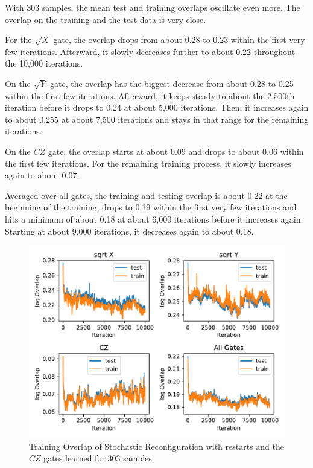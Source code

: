 With 303 samples, the mean test and training overlaps oscillate even more. The overlap on the training and the 
test data is very close. 

For the $\sqrt{X}$ gate, the overlap drops from about 0.28 to 0.23 within the first very few iterations. 
Afterward, it slowly decreases further to about 0.22 throughout the 10,000 iterations.

On the $\sqrt{Y}$ gate, the overlap has the biggest decrease from about 0.28 to 0.25 within the first 
few iterations. Afterward, it keeps steady to about the 2,500th iteration before it drops to 0.24 at about 5,000 iterations.
Then, it increases again to about 0.255 at about 7,500 iterations and stays in that range for the remaining iterations.

On the $CZ$ gate, the overlap starts at about 0.09 and drops to about 0.06 within the first few iterations. 
For the remaining training process, it slowly increases again to about 0.07. 

Averaged over all gates, the training and testing overlap is about 0.22 at the beginning of the training, 
drops to 0.19 within the first very few iterations and hits a minimum of about 0.18 at about 6,000 iterations before 
it increases again. Starting at about 9,000 iterations, it decreases again to about 0.18.

\begin{figure}[H]
  \centering
  \includegraphics[width=\textwidth]{figures/results/SR-restarts-learned/avgOverlap_303.pdf}
  \caption[Training and Testing Overlaps for Stochastic Reconfiguration with Random Restarts and $CZ$ Gates Learned - 303 Samples]{Training 
  Overlap of Stochastic Reconfiguration with restarts and the $CZ$ gates learned for 303 samples.}
  \label{fig:sr_restarts_overlap_303}
\end{figure}

